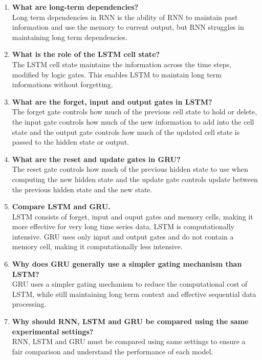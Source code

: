 \documentclass[10pt]{article}
\begin{document}
\begin{enumerate}
\item \textbf{What are long-term dependencies?}\\
Long term dependencies in RNN is the ability of RNN to maintain past information and use the memory to current output, but RNN struggles in maintaining long term dependencies.

\item \textbf{What is the role of the LSTM cell state?}\\
The LSTM cell state maintains the information across the time steps, modified by logic gates. This enables LSTM to maintain long term informations without forgetting.

\item \textbf{What are the forget, input and output gates in LSTM?}\\
The forget gate controls how much of the previous cell state to hold or delete, the input gate controls how much of the new information to add into the cell state and the output gate controls how much of the updated cell state is passed to the hidden state or output.

\item \textbf{What are the reset and update gates in GRU?}\\
The reset gate controls how much of the previous hidden state to use when
computing the new hidden state and the update gate controls update between the previous hidden state and the new state.

\item \textbf{Compare LSTM and GRU.}\\
LSTM consists of forget, input and ouput gates and memory cells, making it more effective for very long time series data. LSTM is computationally intensive. GRU uses only input and output gates and do not contain a memory cell, making it computationally less intensive.

\item \textbf{Why does GRU generally use a simpler gating mechanism than LSTM?}\\
GRU uses a simpler gating mechanism to reduce the computational cost of LSTM, while still maintaining long term context and effective sequential data processing.

\item \textbf{Why should RNN, LSTM and GRU be compared using the same experimental settings?}\\
RNN, LSTM and GRU must be compared using same settings to ensure a fair comparison and understand the performance of each model.


\end{enumerate}
\end{document}
